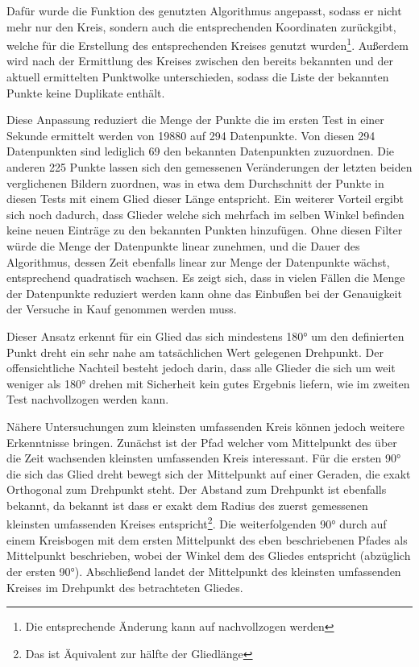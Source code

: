 Dafür wurde die Funktion des genutzten Algorithmus angepasst, sodass er nicht mehr nur den Kreis, sondern auch die entsprechenden Koordinaten zurückgibt, welche für die Erstellung des entsprechenden Kreises genutzt wurden\footnote{Die entsprechende Änderung kann auf  nachvollzogen werden}.
Au{\ss}erdem wird nach der Ermittlung des Kreises zwischen den bereits bekannten und der aktuell ermittelten Punktwolke unterschieden, sodass die Liste der bekannten Punkte keine Duplikate enthält.

Diese Anpassung reduziert die Menge der Punkte die im ersten Test in einer Sekunde ermittelt werden von 19880 auf 294 Datenpunkte.
Von diesen 294 Datenpunkten sind lediglich 69 den bekannten Datenpunkten zuzuordnen.
Die anderen 225 Punkte lassen sich den gemessenen Veränderungen der letzten beiden verglichenen Bildern zuordnen, was in etwa dem Durchschnitt der Punkte in diesen Tests mit einem Glied dieser Länge entspricht.
Ein weiterer Vorteil ergibt sich noch dadurch, dass Glieder welche sich mehrfach im selben Winkel befinden keine neuen Einträge zu den bekannten Punkten hinzufügen.
Ohne diesen Filter würde die Menge der Datenpunkte linear zunehmen, und die Dauer des Algorithmus, dessen Zeit ebenfalls linear zur Menge der Datenpunkte wächst, entsprechend quadratisch wachsen.
Es zeigt sich, dass in vielen Fällen die Menge der Datenpunkte reduziert werden kann ohne das Einbu{\ss}en bei der Genauigkeit der Versuche in Kauf genommen werden muss.

Dieser Ansatz erkennt für ein Glied das sich mindestens 180° um den definierten Punkt dreht ein sehr nahe am tatsächlichen Wert gelegenen Drehpunkt.
Der offensichtliche Nachteil besteht jedoch darin, dass alle Glieder die sich um weit weniger als 180° drehen mit Sicherheit kein gutes Ergebnis liefern, wie im zweiten Test nachvollzogen werden kann.

Nähere Untersuchungen zum kleinsten umfassenden Kreis können jedoch weitere Erkenntnisse bringen.
Zunächst ist der Pfad welcher vom Mittelpunkt des über die Zeit wachsenden kleinsten umfassenden Kreis interessant.
Für die ersten 90° die sich das Glied dreht bewegt sich der Mittelpunkt auf einer Geraden, die exakt Orthogonal zum Drehpunkt steht.
Der Abstand zum Drehpunkt ist ebenfalls bekannt, da bekannt ist dass er exakt dem Radius des zuerst gemessenen kleinsten umfassenden Kreises entspricht\footnote{Das ist Äquivalent zur hälfte der Gliedlänge}.
Die weiterfolgenden 90° durch auf einem Kreisbogen mit dem ersten Mittelpunkt des eben beschriebenen Pfades als Mittelpunkt beschrieben, wobei der Winkel dem des Gliedes entspricht (abzüglich der ersten 90°).
Abschlie{\ss}end landet der Mittelpunkt des kleinsten umfassenden Kreises im Drehpunkt des betrachteten Gliedes.

